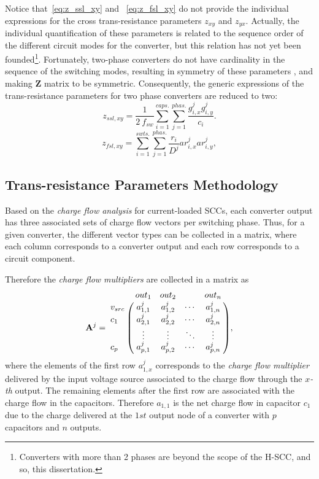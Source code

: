 Notice that~\eqref{eq:z_ssl_xy} and ~\eqref{eq:z_fsl_xy} do not provide the individual expressions for the cross trans-resistance parameters $z_{xy}$ and $z_{yx}$. Actually, the individual quantification of these parameters is related to the sequence order of the different circuit modes for the converter, but this relation has not yet been founded\footnote{Converters with more than 2 phases are beyond the scope of the H-SCC, and so, this dissertation.}. Fortunately,  two-phase converters do not have cardinality  in the sequence of the switching modes, resulting in symmetry of these parameters , and making $\mathbf{Z}$ matrix to be symmetric. Consequently, the generic expressions of the trans-resistance parameters for two phase converters are reduced to two:
\begin{equation}
  z_{ssl,xy}  =  \frac{1}{2~f_{sw}} \sum_{i=1}^{caps.} \sum_{j=1}^{phas.}
  \frac{g_{i,x}^j g_{i,y}^j}{c_i}.
 \label{eq:z_ssl_xy_2ph}
\end{equation}
\begin{equation}
  z_{fsl,xy} =   \sum_{i=1}^{swts.} \sum_{j=1}^{phas.}
  \frac{r_{i}}{D^j} ar_{i,x}^j ar_{i,y}^j,
 \label{eq:z_fsl_xy_2ph}
\end{equation}


\subsection{Trans-resistance Parameters Methodology}
Based on the \emph{charge flow analysis} for current-loaded SCCs, each converter output has three associated sets of charge flow vectors per switching phase. Thus, for a given converter, the different vector types can be collected in a matrix, where each column corresponds to a converter output and each row corresponds to a circuit component.

Therefore the \emph{charge flow multipliers} are collected in a matrix as
\begin{equation}
 \mathbf{A}^j =
   \bordermatrix { ~ & out_1 & out_2 & ~ & out_n \cr
     v_{src} & a_{1,1}^j  & a_{1,2}^j & \cdots & a_{1,n}^j \cr
     c_1    & a_{2,1}^j  & a_{2,2}^j & \cdots & a_{2,n}^j \cr
      ~     & \vdots     & \vdots & \ddots & \vdots \cr
     c_p    & a_{p,1}^j  & a_{p,2}^j & \cdots & a_{p,n}^j \cr},
 \label{eq:A_matrix}
\end{equation}
where the elements of the first row  $a_{1,x}^j$ corresponds to the \emph{charge flow multiplier}  delivered by the input voltage source associated to the charge flow through the $x$\emph{-th} output. The remaining elements after the first row are associated with the charge flow in the capacitors. Therefore $a_{1,1}$ is the net charge flow in capacitor $c_1$ due to the charge delivered at the $1st$ output node of a converter with $p$ capacitors and $n$ outputs.

